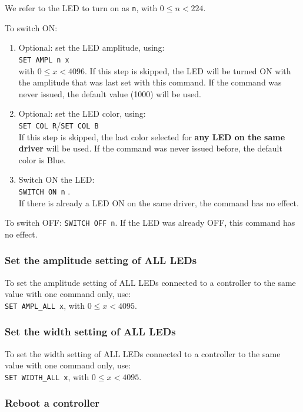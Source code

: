 \documentclass[12pt]{article}
\begin{document}
      We refer to the LED to turn on as \texttt{n}, with $0\leq n < 224$.

      To switch ON:
      \begin{enumerate}
      \item{Optional: set the LED amplitude, using:\\
      \texttt{SET AMPL n x}\\
      with $0\leq x < 4096$. If this step is skipped, the LED will be turned ON with the amplitude that was last set with this command. If the command was never issued, the default value (1000) will be used.}
      \item{Optional: set the LED color, using:\\
      \texttt{SET COL R}/\texttt{SET COL B}\\
      If this step is skipped, the last color selected for \textbf{any LED on the same driver} will be used. If the command was never issued before, the default color is Blue.}
      \item{Switch ON the LED:\\
      \texttt{SWITCH ON n}
      }.\\
       If there is already a  LED ON on the same driver, the command has no effect.
      \end{enumerate}

      To switch OFF: \texttt{SWITCH OFF n}. If the LED was already OFF, this command has no effect.

      \subsubsection{Set the amplitude setting of ALL LEDs}

      To set the amplitude setting of ALL LEDs connected to a controller to the same value with one command only, use:\\
      \texttt{SET AMPL\_ALL x}, with $0\leq x < 4095$.

      \subsubsection{Set the width setting of ALL LEDs}

      To set the width setting of ALL LEDs connected to a controller to the same value with one command only, use:\\
      \texttt{SET WIDTH\_ALL x}, with $0\leq x < 4095$.


      \subsubsection{Reboot a controller}
\end{document}
